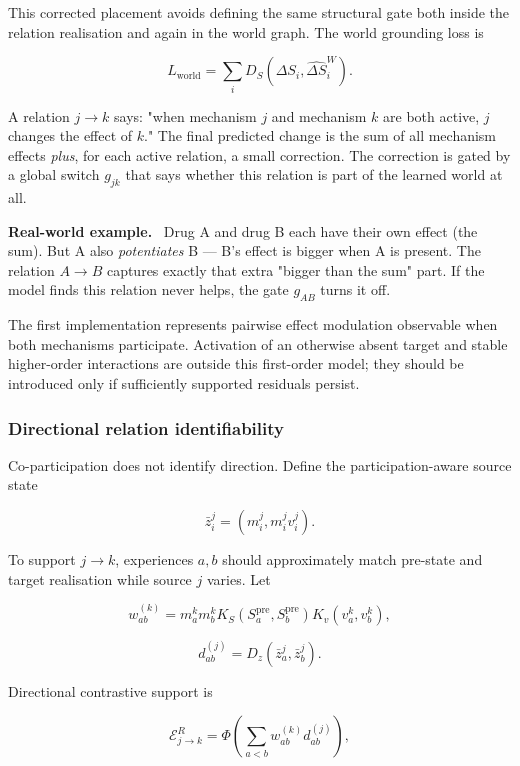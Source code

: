 \documentclass[11pt]{article}
\newenvironment{plainword}{%
  \par\medskip\noindent\begin{minipage}{\textwidth}%
  \color{gray!75!black}\small\itshape
}{%
  \end{minipage}\par\medskip}
\newenvironment{example}{%
  \par\smallskip\noindent\begin{minipage}{\textwidth}%
  \color{teal!60!black}\small
  \textbf{\color{teal!70!black}Real-world example.}\
}{%
  \end{minipage}\par\smallskip}
\begin{document}
This corrected placement avoids defining the same structural gate both inside the relation realisation and again in the world graph.
The world grounding loss is

\[
\boxed{L_{\mathrm{world}}=\sum_iD_S(\Delta S_i,\widehat{\Delta S}_i^W).}
\]

\begin{plainword}
A relation $j\to k$ says: "when mechanism $j$ and mechanism $k$ are both active, $j$ changes the effect of $k$." The final predicted
change is the sum of all mechanism effects \emph{plus}, for each active relation, a small correction. The correction is gated by a
global switch $g_{jk}$ that says whether this relation is part of the learned world at all.
\end{plainword}

\begin{example}
Drug A and drug B each have their own effect (the sum). But A also \emph{potentiates} B --- B's effect is bigger when A is present.
The relation $A\to B$ captures exactly that extra "bigger than the sum" part. If the model finds this relation never helps, the gate
$g_{AB}$ turns it off.
\end{example}

The first implementation represents pairwise effect modulation observable when both mechanisms participate. Activation of an
otherwise absent target and stable higher-order interactions are outside this first-order model; they should be introduced only if
sufficiently supported residuals persist.

\subsubsection*{Directional relation identifiability}

Co-participation does not identify direction. Define the participation-aware source state

\[
\boxed{\bar z_i^j=(m_i^j,m_i^jv_i^j).}
\]

To support $j\rightarrow k$, experiences $a,b$ should approximately match pre-state and target realisation while source $j$ varies.
Let

\[
w_{ab}^{(k)}=m_a^km_b^k
K_S(S_a^{\mathrm{pre}},S_b^{\mathrm{pre}})
K_v(v_a^k,v_b^k),
\]

\[
d_{ab}^{(j)}=D_z(\bar z_a^j,\bar z_b^j).
\]

Directional contrastive support is

\[
\boxed{
\mathcal E_{j\rightarrow k}^{R}=
\Phi\!\left(\sum_{a<b}w_{ab}^{(k)}d_{ab}^{(j)}\right),}
\]
\end{document}
